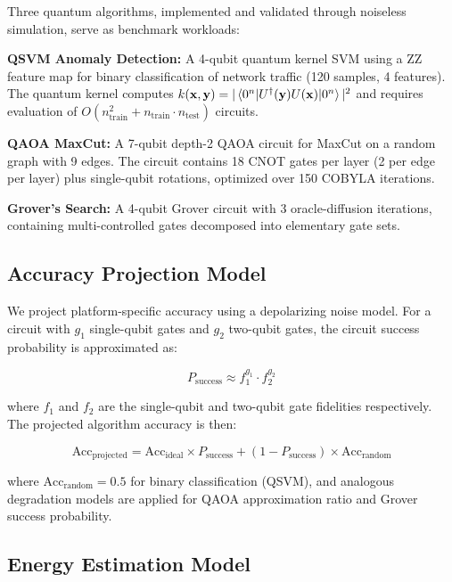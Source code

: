 \documentclass[conference]{IEEEtran}
\begin{document}
Three quantum algorithms, implemented and validated through noiseless simulation, serve as benchmark workloads:

\textbf{QSVM Anomaly Detection:} A 4-qubit quantum kernel SVM using a ZZ feature map for binary classification of network traffic (120 samples, 4 features). The quantum kernel computes $k(\mathbf{x}, \mathbf{y}) = |\braket{0^n | U^{\dagger}(\mathbf{y}) U(\mathbf{x}) | 0^n}|^2$ and requires evaluation of $O(n_{\text{train}}^2 + n_{\text{train}} \cdot n_{\text{test}})$ circuits.

\textbf{QAOA MaxCut:} A 7-qubit depth-2 QAOA circuit for MaxCut on a random graph with 9 edges. The circuit contains 18 CNOT gates per layer (2 per edge per layer) plus single-qubit rotations, optimized over 150 COBYLA iterations.

\textbf{Grover's Search:} A 4-qubit Grover circuit with 3 oracle-diffusion iterations, containing multi-controlled gates decomposed into elementary gate sets.

\subsection{Accuracy Projection Model}

We project platform-specific accuracy using a depolarizing noise model. For a circuit with $g_1$ single-qubit gates and $g_2$ two-qubit gates, the circuit success probability is approximated as:

\begin{equation}
P_{\text{success}} \approx f_1^{g_1} \cdot f_2^{g_2}
\end{equation}

where $f_1$ and $f_2$ are the single-qubit and two-qubit gate fidelities respectively. The projected algorithm accuracy is then:

\begin{equation}
\text{Acc}_{\text{projected}} = \text{Acc}_{\text{ideal}} \times P_{\text{success}} + (1 - P_{\text{success}}) \times \text{Acc}_{\text{random}}
\end{equation}

where $\text{Acc}_{\text{random}} = 0.5$ for binary classification (QSVM), and analogous degradation models are applied for QAOA approximation ratio and Grover success probability.

\subsection{Energy Estimation Model}
\end{document}
